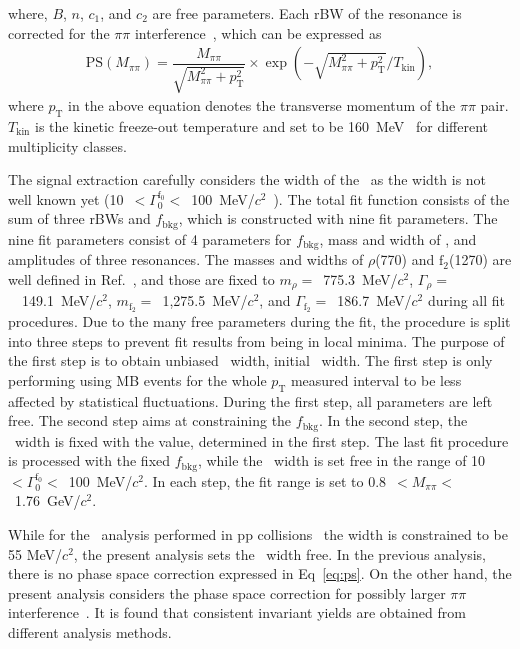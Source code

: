 where, $B$, $n$, $c_{1}$, and $c_{2}$ are free parameters. Each rBW of the resonance is corrected for the $\pi\pi$ interference~\cite{Rapp:2003ar}, which can be expressed as
\begin{eqnarray}
\mathrm{PS}(M_{\pi\pi}) = \dfrac{M_{\pi\pi}}{\sqrt{M_{\pi\pi}^{2}+p_{\mathrm{T}}^{2}}}\times\exp{(-\sqrt{M_{\pi\pi}^{2}+p_{\mathrm{T}}^{2}}/T_{\mathrm{kin}})},
\label{eq:ps}
\end{eqnarray} 
where $p_{\mathrm{T}}$ in the above equation denotes the transverse momentum of the $\pi\pi$ pair. $T_{\mathrm{kin}}$ is the kinetic freeze-out temperature and set to be 160~MeV~\cite{ALICE:2018qdv} for different multiplicity classes.

The signal extraction carefully considers the width of the \fzero~as the width is not well known yet (10~$<\Gamma_{0}^{\mathrm{f}_{0}}<$~100~MeV/$c^{2}$~\cite{ParticleDataGroup:2020ssz}). The total fit function consists of the sum of three rBWs and $f_{\mathrm{bkg}}$, which is constructed with nine fit parameters. The nine fit parameters consist of 4 parameters for $f_{\mathrm{bkg}}$, mass and width of \fzero, and amplitudes of three resonances. The masses and widths of $\rho$(770) and $\mathrm{f}_{2}$(1270) are well defined in Ref.~\cite{ParticleDataGroup:2020ssz}, and those are fixed to $m_{\rho}=$~775.3~MeV/$c^{2}$, $\Gamma_{\rho}=$~~149.1~MeV/$c^{2}$, $m_{\mathrm{f}_{2}}=$~1,275.5~MeV/$c^{2}$, and $\Gamma_{\mathrm{f}_{2}}=$~186.7~MeV/$c^{2}$ during all fit procedures. Due to the many free parameters during the fit, the procedure is split into three steps to prevent fit results from being in local minima. The purpose of the first step is to obtain unbiased \fzero~width, initial \fzero~width. The first step is only performing using MB events for the whole $p_{\mathrm{T}}$ measured interval to be less affected by statistical fluctuations. During the first step, all parameters are left free. The second step aims at constraining the $f_{\mathrm{bkg}}$. In the second step, the \fzero~width is fixed with the value, determined in the first step. The last fit procedure is processed with the fixed $f_{\mathrm{bkg}}$, while the \fzero~width is set free in the range of 10~$<\Gamma_{0}^{\mathrm{f}_{0}}<$~100~MeV/$c^{2}$. In each step, the fit range is set to 0.8~$<M_{\pi\pi}<$~1.76~GeV/$c^{2}$.

While for the \fzero~analysis performed in pp collisions~\cite{ALICE:2022qnb} the width is constrained to be 55 MeV/$c^{2}$, the present analysis sets the \fzero~width free. In the previous analysis, there is no phase space correction expressed in Eq~\ref{eq:ps}. On the other hand, the present analysis considers the phase space correction for possibly larger $\pi\pi$ interference~\cite{STAR:2003vqj}. It is found that consistent invariant yields are obtained from different analysis methods.

